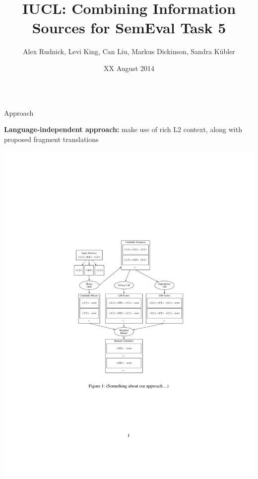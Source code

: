 \documentclass[final,t]{beamer}
\title[]{IUCL: Combining Information Sources for SemEval Task 5}
\author[]{Alex Rudnick, Levi King, Can Liu, Markus Dickinson, Sandra K\"ubler}
\institute[]{Indiana University}
\date[]{XX August 2014}
\begin{document}
\begin{frame}{}
  \begin{columns}[t]
    \begin{column}{.5\linewidth}

\begin{block}{Approach}

  \textbf{Language-independent approach:} make use of rich L2 context,
  along with proposed fragment translations

  \medskip



  \includegraphics[width=.9\textwidth]{flowchart/chart}


\end{block}
\end{column}
\end{columns}
\end{frame}
\end{document}
